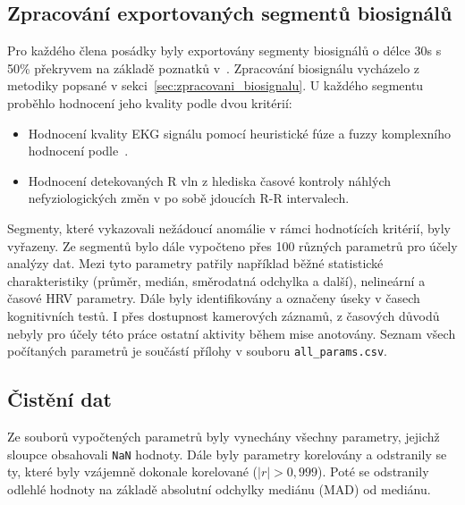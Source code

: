 \subsection{Zpracování exportovaných segmentů biosignálů}
\label{subsec:prezpracovani_segmentu}
Pro každého člena posádky byly exportovány segmenty biosignálů o délce 30s s
50\% překryvem na základě poznatků
v~\cite{Castaldo2019,Kim2021,Pecchia2018,Shaffer2020,Tervonen2021}. Zpracování
biosignálu vycházelo z metodiky popsané v sekci~\ref{sec:zpracovani_biosignalu}.
U každého segmentu proběhlo hodnocení jeho kvality podle dvou kritérií:
\begin{itemize}
      \item Hodnocení kvality \gls{EKG} signálu pomocí heuristické fúze a fuzzy
            komplexního hodnocení podle~\cite{Zhao2018}.
      \item Hodnocení detekovaných R vln z hlediska časové kontroly náhlých
            nefyziologických změn v po sobě jdoucích R-R intervalech.
\end{itemize}
Segmenty, které vykazovali nežádoucí anomálie v rámci hodnotících kritérií, byly
vyřazeny. Ze segmentů bylo dále vypočteno přes 100 různých parametrů pro účely
analýzy dat. Mezi tyto parametry patřily například běžné statistické
charakteristiky (průměr, medián, směrodatná odchylka a další), nelineární a
časové \gls{HRV} parametry. Dále byly identifikovány a označeny úseky v časech
kognitivních testů. I přes dostupnost kamerových záznamů, z časových důvodů
nebyly pro účely této práce ostatní aktivity během mise anotovány. Seznam všech
počítaných parametrů je součástí přílohy v souboru \texttt{all\_params.csv}. 

\subsection{Čistění dat}
\label{subsec:cisteni_dat}
Ze souborů vypočtených parametrů byly vynechány všechny parametry, jejichž
sloupce obsahovali \texttt{NaN} hodnoty. Dále byly parametry korelovány a
odstranily se ty, které byly vzájemně dokonale korelované ($|r| > 0,999$). Poté
se odstranily odlehlé hodnoty na základě absolutní odchylky mediánu (MAD) od
mediánu.

